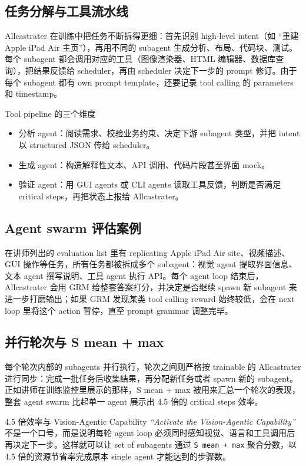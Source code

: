 \documentclass[a4paper]{article}
\begin{document}
\subsection{任务分解与工具流水线}
Allcastrater 在训练中把任务不断拆得更细：首先识别 high-level intent（如 ``重建 Apple iPad Air 主页''），再用不同的 subagent 生成分析、布局、代码块、测试。每个 subagent 都会调用对应的工具（图像渲染器、HTML 编辑器、数据库查询），把结果反馈给 scheduler，再由 scheduler 决定下一步的 prompt 修订。由于每个 subagent 都有 own prompt template，还要记录 tool calling 的 parameters 和 timestamp。

\begin{knowledgebox}{Tool pipeline 的三个维度}
\begin{itemize}
    \item 分析 agent：阅读需求、校验业务约束、决定下游 subagent 类型，并把 intent 以 structured JSON 传给 scheduler。
    \item 生成 agent：构造解释性文本、API 调用、代码片段甚至界面 mock。
    \item 验证 agent：用 GUI agents 或 CLI agents 读取工具反馈，判断是否满足 critical steps，再把状态上报给 Allcastrater。
\end{itemize}
\end{knowledgebox}

\subsection{Agent swarm 评估案例}
在讲师列出的 evaluation list 里有 replicating Apple iPad Air site、视频描述、GUI 操作等任务，所有任务都被拆成多个 subagent：视觉 agent 提取界面信息、文本 agent 撰写说明、工具 agent 执行 API。每个 agent loop 结束后，Allcastrater 会用 GRM 给整套答案打分，并决定是否继续 spawn 新 subagent 来进一步打磨输出；如果 GRM 发现某类 tool calling reward 始终较低，会在 next loop 里将这个 action 暂停，直至 prompt grammar 调整完毕。

\subsection{并行轮次与 S mean + max}
每个轮次内部的 subagents 并行执行，轮次之间则严格按 trainable 的 Allcastrater 进行同步：完成一批任务后收集结果，再分配新任务或者 spawn 新的 subagent。正如讲师在训练监控里展示的那样，S mean + max 被用来汇总一个轮次的表现，整套 agent swarm 比起单一 agent 展示出 4.5 倍的 critical steps 效率。

\begin{importantbox}{4.5 倍效率与 Vision-Agentic Capability}
\textit{``Activate the Vision-Agentic Capability''} 不是一个口号，而是说明每轮 agent loop 必须同时感知视觉、语言和工具调用后再决定下一步。这样就可以让 set of subagents 通过 \texttt{S mean + max} 聚合分数，以 4.5 倍的资源节省率完成原本 single agent 才能达到的步骤数。
\end{importantbox}
\end{document}
